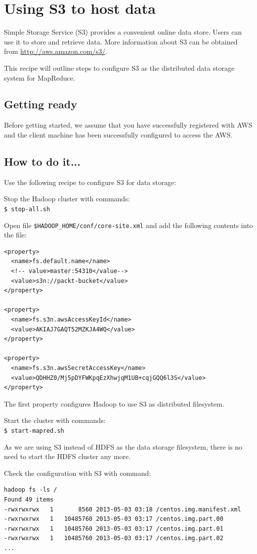 \section{Using S3 to host data}
Simple Storage Service (S3) provides a convenient online data store. Users can use it to store and retrieve data. More information about S3 can be obtained from \url{http://aws.amazon.com/s3/}.

This recipe will outline steps to configure S3 as the distributed data storage system for MapReduce.

\subsection*{Getting ready}
Before getting started, we assume that you have successfully registered with AWS and the client machine has been successfully configured to access the AWS.

\subsection*{How to do it...}
Use the following recipe to configure S3 for data storage:

Stop the Hadoop cluster with commands: \\
\verb|$ stop-all.sh|

Open file \verb|$HADOOP_HOME/conf/core-site.xml| and add the following contents into the file:
\lstset{style=bashstyle}
\begin{lstlisting}
<property>
  <name>fs.default.name</name>
  <!-- value>master:54310</value-->
  <value>s3n://packt-bucket</value>
</property>

<property>
  <name>fs.s3n.awsAccessKeyId</name>
  <value>AKIAJ7GAQT52MZKJA4WQ</value>
</property>

<property>
  <name>fs.s3n.awsSecretAccessKey</name>
  <value>QDHHZ0/Mj5pDYFWKpqEzXhwjqM1UB+cqjGQQ6l3S</value>
</property>
\end{lstlisting}

The first property configures Hadoop to use S3 as distributed filesystem.

Start the cluster with commands: \\
\verb|$ start-mapred.sh|

As we are using S3 instead of HDFS as the data storage filesystem, there is no need to start the HDFS cluster any more.

Check the configuration with S3 with command:
\lstset{style=bashstyle}
\begin{lstlisting}
hadoop fs -ls /
Found 49 items
-rwxrwxrwx   1       8560 2013-05-03 03:18 /centos.img.manifest.xml
-rwxrwxrwx   1   10485760 2013-05-03 03:17 /centos.img.part.00
-rwxrwxrwx   1   10485760 2013-05-03 03:17 /centos.img.part.01
-rwxrwxrwx   1   10485760 2013-05-03 03:17 /centos.img.part.02
...
\end{lstlisting}

